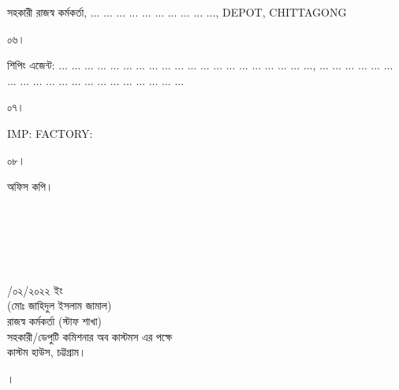 \documentclass[12pt]{article}
\newcommand{\rdepo}{... ... ... ... ... ... ... ... ... ..., DEPOT, CHITTAGONG}
\newcommand{\robdt}{\hspace{2.0em}/০২/২০২২ ইং}
\newcommand{\impn}{\jsml}
\newcommand{\impadd}{\jsmla}
\newcommand{\san}{... ... ... ... ... ... ... ... ... ... ... ... ... ... ... ... ... ... ... ...}
\newcommand{\sad}{... ... ... ... ... ... ... ... ... ... ... ... ... ... ... ... ... ... ... ...}
\begin{document}
\begin{minipage}[t]{0.94\linewidth}
\scriptsize{সহকারী রাজস্ব কর্মকর্তা, {\rdepo}}
\end{minipage}
\begin{minipage}[t]{0.06\linewidth}
\scriptsize{০৬।}
\end{minipage}
\begin{minipage}[t]{0.94\linewidth}
\scriptsize{শিপিং এজেন্ট:
{\san}, {\sad}}
\end{minipage}
\begin{minipage}[t]{0.06\linewidth}
\scriptsize{০৭।}
\end{minipage}
\begin{minipage}[t]{0.94\linewidth}
\scriptsize{IMP: {\impn}
FACTORY:{\impadd}}
\end{minipage}
\begin{minipage}[t]{0.06\linewidth}
\scriptsize{০৮।}
\end{minipage}
\begin{minipage}[t]{0.94\linewidth}
\scriptsize{অফিস কপি।}
\\
\\
\\
\\
\\
\\
\end{minipage}
\begin{minipage}[t]{0.60\linewidth}
\hspace{1em}
\end{minipage}
\begin{minipage}[t]{0.40\linewidth}
\begin{center}
\scriptsize{{\robdt}}
\\
\footnotesize{(মোঃ জাহিদুল ইসলাম জামাল)}
\\
\footnotesize{রাজস্ব কর্মকর্তা (স্টাফ শাখা)}
\\
\scriptsize{সহকারী/ডেপুটি কমিশনার অব কাস্টমস এর পক্ষে}
\\
\scriptsize{কাস্টম হাউস, চট্টগ্রাম।}
\end{center}
\end{minipage}
{\nfpage}
\normalsize
\begin{minipage}[t]{0.04\linewidth}
।
\end{minipage}
\end{document}
